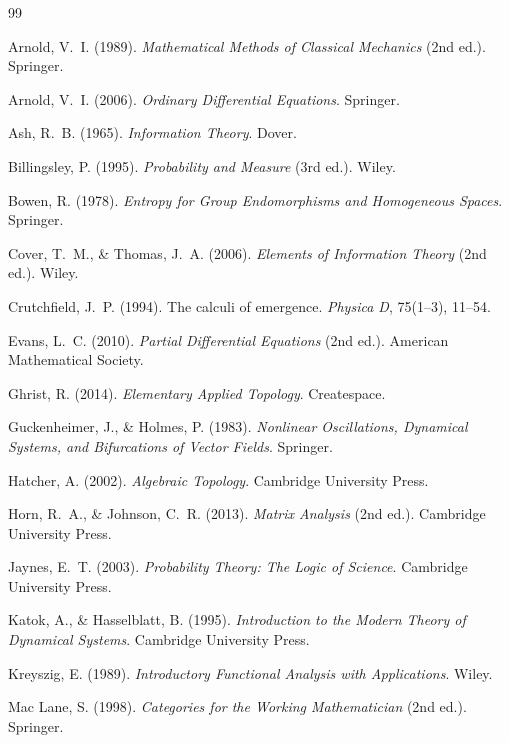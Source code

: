 \documentclass[12pt, oneside]{book}
\theoremstyle{plain}
\theoremstyle{definition}
\theoremstyle{remark}
\begin{document}
\begin{thebibliography}{99}

Arnold, V.~I. (1989).
\textit{Mathematical Methods of Classical Mechanics} (2nd ed.).
Springer.

Arnold, V.~I. (2006).
\textit{Ordinary Differential Equations}.
Springer.

Ash, R.~B. (1965).
\textit{Information Theory}.
Dover.

Billingsley, P. (1995).
\textit{Probability and Measure} (3rd ed.).
Wiley.

Bowen, R. (1978).
\textit{Entropy for Group Endomorphisms and Homogeneous Spaces}.
Springer.

Cover, T.~M., \& Thomas, J.~A. (2006).
\textit{Elements of Information Theory} (2nd ed.).
Wiley.

Crutchfield, J.~P. (1994).
The calculi of emergence.
\textit{Physica D}, 75(1--3), 11--54.

Evans, L.~C. (2010).
\textit{Partial Differential Equations} (2nd ed.).
American Mathematical Society.

Ghrist, R. (2014).
\textit{Elementary Applied Topology}.
Createspace.

Guckenheimer, J., \& Holmes, P. (1983).
\textit{Nonlinear Oscillations, Dynamical Systems, and
Bifurcations of Vector Fields}.
Springer.

Hatcher, A. (2002).
\textit{Algebraic Topology}.
Cambridge University Press.

Horn, R.~A., \& Johnson, C.~R. (2013).
\textit{Matrix Analysis} (2nd ed.).
Cambridge University Press.

Jaynes, E.~T. (2003).
\textit{Probability Theory: The Logic of Science}.
Cambridge University Press.

Katok, A., \& Hasselblatt, B. (1995).
\textit{Introduction to the Modern Theory of Dynamical Systems}.
Cambridge University Press.

Kreyszig, E. (1989).
\textit{Introductory Functional Analysis with Applications}.
Wiley.

Mac Lane, S. (1998).
\textit{Categories for the Working Mathematician} (2nd ed.).
Springer.


\end{thebibliography}
\end{document}
